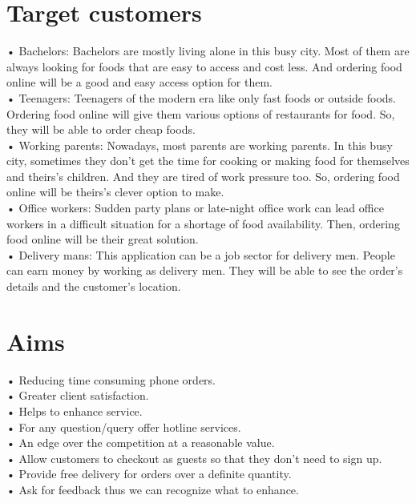 \documentclass[letterpaper]{report}
\begin{document}
\section{Target customers}

•	Bachelors: Bachelors are mostly living alone in this busy city. Most of them are always looking for foods that are easy to access and cost less. And ordering food online will be a good and easy access option for them.\\
 
•	Teenagers: Teenagers of the modern era like only fast foods or outside foods. Ordering food online will give them various options of restaurants for food. So, they will be able to order cheap foods.\\

•	Working parents: Nowadays, most parents are working parents. In this busy city, sometimes they don’t get the time for cooking or making food for themselves and theirs’s children. And they are tired of work pressure too. So, ordering food online will be theirs’s clever option to make.\\

•	Office workers: Sudden party plans or late-night office work can lead office workers in a difficult situation for a shortage of food availability. Then, ordering food online will be their great solution.\\


•	Delivery mans: This application can be a job sector for delivery men. People can earn money by working as delivery men. They will be able to see the order’s details and the customer’s location.
\section{Aims}

• Reducing time consuming phone orders.\\
• Greater client satisfaction.\\
• Helps to enhance service.\\
• For any question/query offer hotline services.\\
• An edge over the competition at a reasonable value.\\
• Allow customers to checkout as guests so that they don’t need to sign up.\\
• Provide free delivery for orders over a definite quantity.\\
• Ask for feedback thus we can recognize what to enhance.\\
\end{document}
